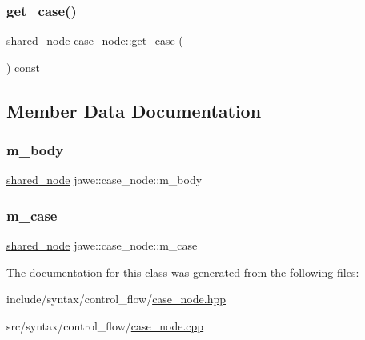 \mbox{\label{classjawe_1_1case__node_a005b7e103d6dec24adf567f7be67d363}} 
\subsubsection{\texorpdfstring{get\+\_\+case()}{get\_case()}}
{\footnotesize\ttfamily \hyperlink{namespacejawe_a3f307481d921b6cbb50cc8511fc2b544}{shared\+\_\+node} case\+\_\+node\+::get\+\_\+case (\begin{DoxyParamCaption}{ }\end{DoxyParamCaption}) const}



\subsection{Member Data Documentation}
\mbox{\label{classjawe_1_1case__node_a50358640675afacd6a8a11d9c4edbb23}} 
\subsubsection{\texorpdfstring{m\+\_\+body}{m\_body}}
{\footnotesize\ttfamily \hyperlink{namespacejawe_a3f307481d921b6cbb50cc8511fc2b544}{shared\+\_\+node} jawe\+::case\+\_\+node\+::m\+\_\+body\hspace{0.3cm}{\ttfamily [private]}}

\mbox{\label{classjawe_1_1case__node_a8d02757ea9e3677d4ff6be8fc01112b6}} 
\subsubsection{\texorpdfstring{m\+\_\+case}{m\_case}}
{\footnotesize\ttfamily \hyperlink{namespacejawe_a3f307481d921b6cbb50cc8511fc2b544}{shared\+\_\+node} jawe\+::case\+\_\+node\+::m\+\_\+case\hspace{0.3cm}{\ttfamily [private]}}



The documentation for this class was generated from the following files\+:\begin{DoxyCompactItemize}
\item 
include/syntax/control\+\_\+flow/\hyperlink{case__node_8hpp}{case\+\_\+node.\+hpp}\item 
src/syntax/control\+\_\+flow/\hyperlink{case__node_8cpp}{case\+\_\+node.\+cpp}\end{DoxyCompactItemize}
